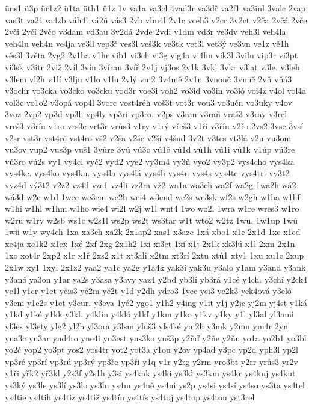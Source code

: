 {üns1
ü3p
ür1z2
ü1ta
üth1
ü1z
1v
va1a
va3cl
4vad3r
va3dř
va2f1
va3inl
3valc
2vap
vas3t
va2ť
va4zb
váh4l
vá2ň
vás3
2vb
vbu4l
2v1c
vceh3
v2cr
3v2ct
v2ča
2včá
2vče
2vči
2včí
2včo
v3dam
vd3au
3v2dá
2vde
2vdi
v1dm
vd3r
ve3dv
veh3l
veh4la
veh4lu
veh4n
ve4ja
ve3ll
vep3ř
ves3l
veš3k
ve3tk
vet3l
vet3ý
ve3vn
ve1z
vě1h
věs3l
3věta
2vg2
2v1ha
v1hr
vib1
vi3ch
vi3g
vig4a
vi4hn
vik3l
3viln
vip3r
vi3pt
vi3sk
v3itr
2viž
2víl
3vín
3víran
3víř
2v1j
vj3os
2v1k
3vkl
3vkr
v3lat
v3le.
v3leh
v3lem
vl2h
v1lí
v3lju
v1lo
v1lu
2vlý
vm2
3v4mě
2v1n
3vnouč
3vnuč
2vň
vňá3
v3ochr
vo3cka
vo3cko
vo3cku
vod3r
voe3i
voh2
vo3id
vo3in
vo3ió
voi4z
v4ol
vol4a
vol3c
vo1o2
v3opá
vop4l
3vorc
vost4réh
voš3t
vot3r
vou3
vo3učn
vo3uky
v4ov
3voz
2vp2
vp3d
vp3li
vp4ly
vp3ri
vp3ro.
v2ps
v3ran
v3raň
vraš3
v3ray
v3rel
vreš3
v3rín
v1ro
vrs3e
vrt3r
vrůs3
v1ry
v1rý
vřeš3
v1ři
v3řín
v2řo
2vs2
3vse
3vsí
v2sr
vst3r
vst4rč
vst4ro
vš2
v2ša
v2še
v2ši
v4šud
3v2t
v3tes
vt3lá
v2u
vu3om
vu3ov
vup2
vus3p
vuš1
3vůre
3vú
vú3c
vú1č
vú1d
vú1h
vú1i
vú1k
v1úp
vú3re
vú3ro
vú2s
vy1
vy4cl
vyč2
vyd2
vye2
vy3m4
vy3ň
vyo2
vy3p2
vys4cho
vys4ka
vys4ke.
vys4ko
vys4ku.
vys4la
vys4lá
vys4li
vys4n
vys4s
vys4te
vys4tri
vy3t2
vyz4d
vý3t2
v2z2
vz4d
vze1
vz4li
vz3ra
vž2
wa1a
wa3ch
wa2f
wa2g
1wa2h
wá2
wá3d
w2c
w1d
1wee
we3em
we2h
wei4
w3end
we2s
we3sk
wf2s
w2gh
w1ha
w1hf
w1hi
w1hl
w1hm
w1ho
wie4
wi2l
w2j
w1l
wnt4
1wo
wo2l
1wra
w1re
wres3
w1ro
w2ru
w1ry
w2sb
ws1c
w2s1l
ws2p
ws2t
ws3tar
w1t
wto2
w2tz
1wu.
1w1up
1wů
1wü
w1y
wy4ch
1xa
xa3ch
xa2k
2x1ap2
xas1
x3aze
1xá
xbo1
x1c
2x1d
1xe
x1ed
xe4ja
xe1k2
x1ex
1xé
2xf
2xg
2x1h2
1xi
xi3et
1xí
x1j
2x1k
xk3lú
x1l
2xm
2x1n
1xo
xot4r
2xp2
x1r
x1ř
2xs2
x1t
xt3ali
x2tm
xt3rí
2xtu
xtú1
xty1
1xu
xu1c
2xup
2x1w
xy1
1xyl
2x1z2
yaa2
ya1c
ya2g
y1a4k
yak3i
yak3u
y3alo
y1am
y3and
y3ank
y3anó
ya3on
y1ar
ya2s
y3asa
y3avy
yaz4
y2bd
yb3lí
yb3rá
y1cé
y4ch.
y3chí
y2ck4
yc1l
y1cr
y1ct
yčis3
yč2m
yč2t
y1d
y2dh
ydro3
1yec
yei3
ye2k3
yek4ová
y3eló
y3eni
y1e2s
y1et
y3eur.
y3eva
1yé2
ygo1
y1h2
y4ing
y1it
y1j
y2jc
yj2m
yj4st
y1ká
y1kd
y1ké
y1kk
y3kl.
y4klin
y4kló
y1kľ
y1km
y1ko
y1kv
y1ky
y1l
yl3al
yl3ami
yl3es
yl3ety
ylg2
yl2h
yl3ora
y3lsm
yluš3
yľs4ké
ym2h
y3mk
y2mn
ym4r
2yn
yna3c
yn3ar
ynd4ro
yne4i
yn3est
yns3ko
ynš3p
y2ňď
y2ňe
y2ňu
yo1a
yo2b1
yo3bl
yo2č
yop2
yo3pt
yos2
yos4tr
yot2
yot3a
y1ou
y2ov
yp4ad
y3pc
yp2d
yph3l
yp2l
yp3ré
yp3rí
yp3rú
yp3rý
yp3ře
yp3ři
y1q
y1r
y2rg
y2rm
yro3bt
y2rr
yrůs3
yr2v
y1ři
yřk2
yř3kl
y2s3f
y2s1h
y3si
ys4kak
ys4ki
ys3kl
ys3km
ys4kr
ys4kuj
ys4kut
ys3ký
ys3le
ys3lí
ys3lo
ys3lu
ys4m
ys4ně
ys4ni
ys2p
ys4si
ys4sí
ys4so
ys3ta
ys4tel
ys4tie
ys4tih
ys4tiz
ys4tiž
ys4tín
ys4tís
ys4toj
ys4top
ys4tou
yst3rel
}

